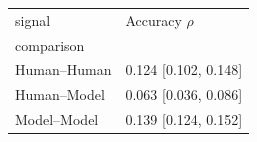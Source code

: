 \begin{tabular}{ll}
\toprule
signal & Accuracy $\rho$  \\
comparison &  \\
\midrule
Human–Human & 0.124 [0.102, 0.148] \\
Human–Model & 0.063 [0.036, 0.086] \\
Model–Model & 0.139 [0.124, 0.152] \\
\bottomrule
\end{tabular}
